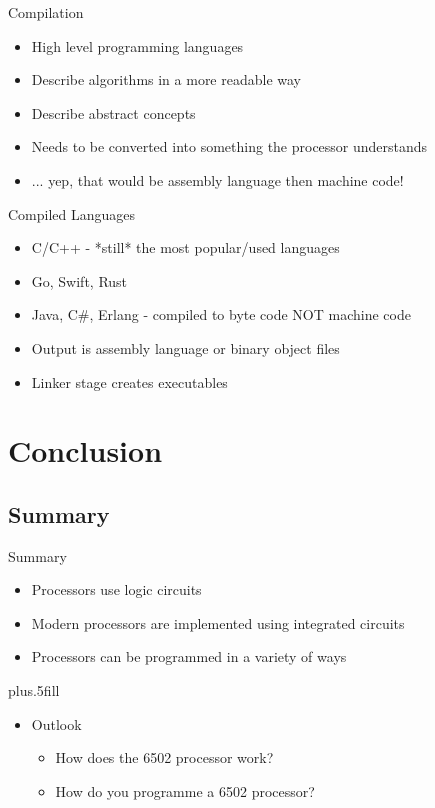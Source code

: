 \documentclass{beamer}
\begin{document}
\begin{frame}{Compilation}
  \begin{itemize}
  \item
    High level programming languages
  \item
    Describe algorithms in a more readable way
  \item
    Describe abstract concepts
  \item
    Needs to be converted into something the processor understands
  \item
    ... yep, that would be assembly language then machine code!
  \end{itemize}
\end{frame}

\begin{frame}{Compiled Languages}
  \begin{itemize}
  \item
    C/C++ - *still* the most popular/used languages
  \item
    Go, Swift, Rust
  \item
    Java, C\#, Erlang - compiled to byte code NOT machine code 
  \item
    Output is assembly language or binary object files
  \item
    Linker stage creates executables
  \end{itemize}
\end{frame}



\section{Conclusion}

\subsection[Summary]{Summary}
  
\begin{frame}{Summary}

  \begin{itemize}
  \item
    Processors use logic circuits
  \item
    Modern processors are implemented using integrated circuits
  \item
    Processors can be programmed in a variety of ways
  \end{itemize}
  
  \vskip0pt plus.5fill
  \begin{itemize}
  \item
    Outlook
    \begin{itemize}
    \item
      How does the 6502 processor work?
    \item
      How do you programme a 6502 processor?
    \end{itemize}
  \end{itemize}
\end{frame}
\end{document}
